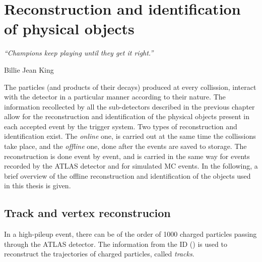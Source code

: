 \chapter{Reconstruction and identification of physical objects}
\label{ch:objects}
\epigraph{\emph{“Champions keep playing until they get it right.”}}{Billie Jean King}


The particles (and products of their decays) produced at every collission, interact with the detector in a particular manner according to their nature. The information recollected by all the sub-detectors described in the previous chapter allow for the reconstruction and identification of the physical objects present in each accepted event by the trigger system. Two types of reconstruction and identification exist. The \textit{online} one, is carried out at the same time the \pp collissions take place, and the \textit{offline} one, done after the events are saved to storage. The reconstruction is done event by event, and is carried in the same way for events recorded by the \ac{ATLAS} detector and for simulated \ac{MC} events. In the following, a brief overview of the offline reconstruction and identification of the objects used in this thesis is given.







\section{Track and vertex reconstrucion}

In a high-pileup event, there can be of the order of 1000 charged particles passing through the \ac{ATLAS} detector. The information from the \ac{ID} (\Sect{\ref{subsec:atlas:atlas:id}}) is used to reconstruct the trajectories of charged particles, called \textit{tracks}.

